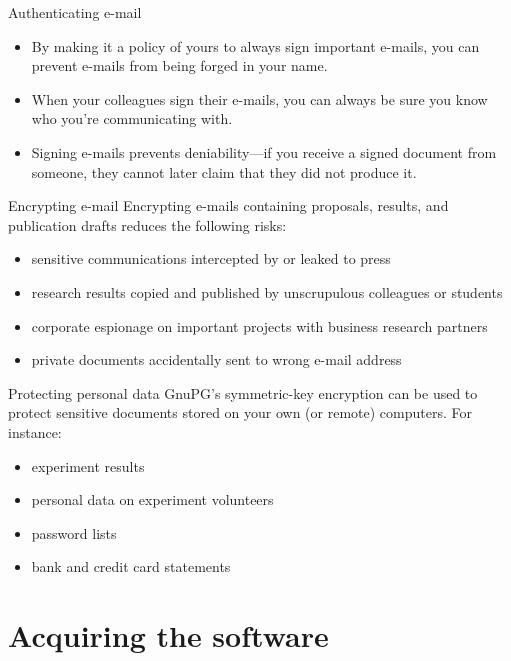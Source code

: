 \documentclass[%
mode=present,%
paper=smartboard,
size=20pt,
]{powerdot}
\begin{document}
\begin{slide}{Authenticating e-mail}
  \begin{itemize}
  \item By making it a policy of yours to always sign important
    e-mails, you can prevent e-mails from being forged in your name.
  \item When your colleagues sign their e-mails,
    you can always be sure you know who you're communicating with.
  \item Signing e-mails prevents deniability---if you receive a signed
    document from someone, they cannot later claim that they did not
    produce it.
  \end{itemize}
\end{slide}

\begin{slide}{Encrypting e-mail}
  Encrypting e-mails containing proposals, results, and publication
  drafts reduces the following risks:\\[1ex]
  \begin{itemize}
  \item sensitive communications intercepted by or leaked to press
  \item research results copied and published by unscrupulous
    colleagues or students
  \item corporate espionage on important projects with business
    research partners
  \item private documents accidentally sent to wrong e-mail address
  \end{itemize}
\end{slide}

\begin{slide}{Protecting personal data}
  GnuPG's symmetric-key encryption can be used to protect sensitive
  documents stored on your own (or remote) computers.  For instance:\\[1ex]
  \begin{itemize}
  \item experiment results
  \item personal data on experiment volunteers
  \item password lists
  \item bank and credit card statements
  \end{itemize}
\end{slide}


\section{Acquiring the software}
\end{document}
